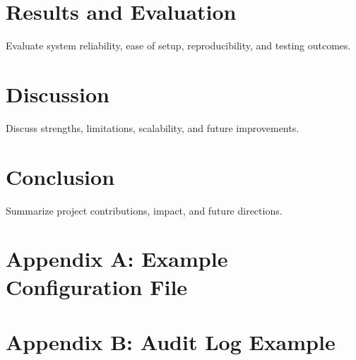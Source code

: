 \documentclass[12pt]{article}
\begin{document}
\section{Results and Evaluation}
Evaluate system reliability, ease of setup, reproducibility, and testing outcomes.

\section{Discussion}
Discuss strengths, limitations, scalability, and future improvements.

\section{Conclusion}
Summarize project contributions, impact, and future directions.




\appendix
\section{Appendix A: Example Configuration File}


\section{Appendix B: Audit Log Example}

\end{document}
